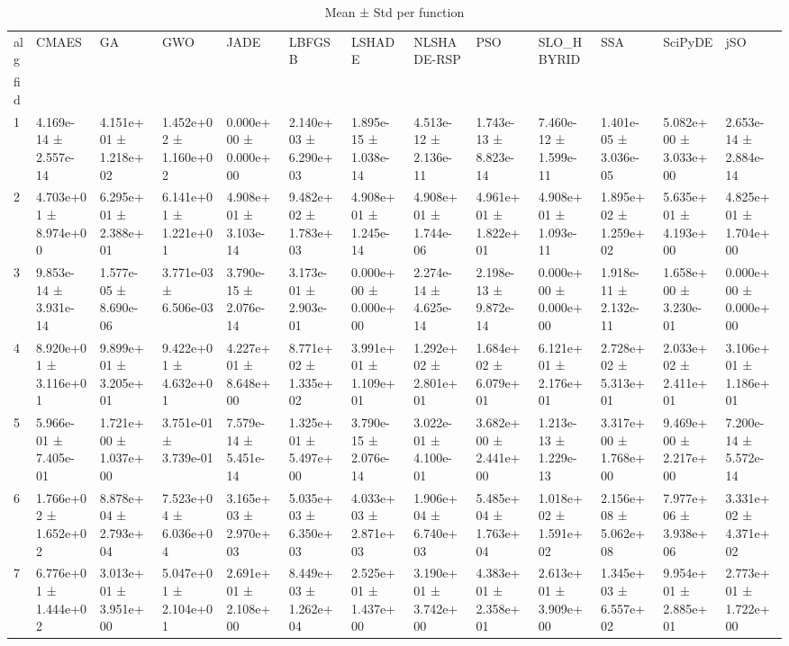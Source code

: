\begin{table}
\caption{Mean ± Std per function}
\label{tab:meanstd_all}
\begin{tabular}{lllllllllllll}
\toprule
alg & CMAES & GA & GWO & JADE & LBFGSB & LSHADE & NLSHADE-RSP & PSO & SLO_HBYRID & SSA & SciPyDE & jSO \\
fid &  &  &  &  &  &  &  &  &  &  &  &  \\
\midrule
1 & 4.169e-14 ± 2.557e-14 & 4.151e+01 ± 1.218e+02 & 1.452e+02 ± 1.160e+02 & 0.000e+00 ± 0.000e+00 & 2.140e+03 ± 6.290e+03 & 1.895e-15 ± 1.038e-14 & 4.513e-12 ± 2.136e-11 & 1.743e-13 ± 8.823e-14 & 7.460e-12 ± 1.599e-11 & 1.401e-05 ± 3.036e-05 & 5.082e+00 ± 3.033e+00 & 2.653e-14 ± 2.884e-14 \\
2 & 4.703e+01 ± 8.974e+00 & 6.295e+01 ± 2.388e+01 & 6.141e+01 ± 1.221e+01 & 4.908e+01 ± 3.103e-14 & 9.482e+02 ± 1.783e+03 & 4.908e+01 ± 1.245e-14 & 4.908e+01 ± 1.744e-06 & 4.961e+01 ± 1.822e+01 & 4.908e+01 ± 1.093e-11 & 1.895e+02 ± 1.259e+02 & 5.635e+01 ± 4.193e+00 & 4.825e+01 ± 1.704e+00 \\
3 & 9.853e-14 ± 3.931e-14 & 1.577e-05 ± 8.690e-06 & 3.771e-03 ± 6.506e-03 & 3.790e-15 ± 2.076e-14 & 3.173e-01 ± 2.903e-01 & 0.000e+00 ± 0.000e+00 & 2.274e-14 ± 4.625e-14 & 2.198e-13 ± 9.872e-14 & 0.000e+00 ± 0.000e+00 & 1.918e-11 ± 2.132e-11 & 1.658e+00 ± 3.230e-01 & 0.000e+00 ± 0.000e+00 \\
4 & 8.920e+01 ± 3.116e+01 & 9.899e+01 ± 3.205e+01 & 9.422e+01 ± 4.632e+01 & 4.227e+01 ± 8.648e+00 & 8.771e+02 ± 1.335e+02 & 3.991e+01 ± 1.109e+01 & 1.292e+02 ± 2.801e+01 & 1.684e+02 ± 6.079e+01 & 6.121e+01 ± 2.176e+01 & 2.728e+02 ± 5.313e+01 & 2.033e+02 ± 2.411e+01 & 3.106e+01 ± 1.186e+01 \\
5 & 5.966e-01 ± 7.405e-01 & 1.721e+00 ± 1.037e+00 & 3.751e-01 ± 3.739e-01 & 7.579e-14 ± 5.451e-14 & 1.325e+01 ± 5.497e+00 & 3.790e-15 ± 2.076e-14 & 3.022e-01 ± 4.100e-01 & 3.682e+00 ± 2.441e+00 & 1.213e-13 ± 1.229e-13 & 3.317e+00 ± 1.768e+00 & 9.469e+00 ± 2.217e+00 & 7.200e-14 ± 5.572e-14 \\
6 & 1.766e+02 ± 1.652e+02 & 8.878e+04 ± 2.793e+04 & 7.523e+04 ± 6.036e+04 & 3.165e+03 ± 2.970e+03 & 5.035e+03 ± 6.350e+03 & 4.033e+03 ± 2.871e+03 & 1.906e+04 ± 6.740e+03 & 5.485e+04 ± 1.763e+04 & 1.018e+02 ± 1.591e+02 & 2.156e+08 ± 5.062e+08 & 7.977e+06 ± 3.938e+06 & 3.331e+02 ± 4.371e+02 \\
7 & 6.776e+01 ± 1.444e+02 & 3.013e+01 ± 3.951e+00 & 5.047e+01 ± 2.104e+01 & 2.691e+01 ± 2.108e+00 & 8.449e+03 ± 1.262e+04 & 2.525e+01 ± 1.437e+00 & 3.190e+01 ± 3.742e+00 & 4.383e+01 ± 2.358e+01 & 2.613e+01 ± 3.909e+00 & 1.345e+03 ± 6.557e+02 & 9.954e+01 ± 2.885e+01 & 2.773e+01 ± 1.722e+00 \\

\end{tabular}
\end{table}
